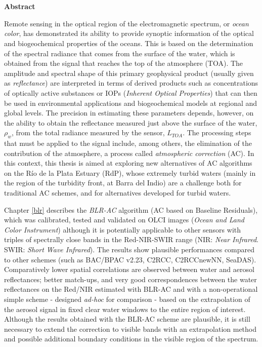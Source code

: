 \chapter*{\runtitle}

\noindent 
\textbf{Abstract}

Remote sensing in the optical region of the electromagnetic spectrum, or \textit{ocean color}, has demonstrated its ability to provide synoptic information of the optical and biogeochemical properties of the oceans. This is based on the determination of the spectral radiance that comes from the surface of the water, which is obtained from the signal that reaches the top of the atmosphere (TOA). The amplitude and spectral shape of this primary geophysical product (usually given as \textit {reflectance}) are interpreted in terms of derived products such as concentrations of optically active substances or IOPs (\textit{Inherent Optical Properties}) that can then be used in environmental applications and biogeochemical models at regional and global levels. The precision in estimating these parameters depends, however, on the ability to obtain the reflectance measured just above the surface of the water, $\rho_{w}$, from the total radiance measured by the sensor, $L_{TOA}$. The processing steps that must be applied to the signal include, among others, the elimination of the contribution of the atmosphere, a process called \textit{atmospheric correction} (AC). In this context, this thesis is aimed at exploring new alternatives of AC algorithms on the Río de la Plata Estuary (RdP), whose extremely turbid waters (mainly in the region of the turbidity front, at Barra del Indio) are a challenge both for traditional AC schemes, and for alternatives developed for turbid waters.

Chapter \ref{blr} describes the \textit{BLR-AC} algorithm (AC based on Baseline Residuals), which was calibrated, tested and validated on OLCI images (\textit{Ocean and Land Color Instrument}) although it is potentially applicable to other sensors with triples of spectrally close bands in the Red-NIR-SWIR range (NIR: \textit{Near Infrared}. SWIR: \textit{Short Wave Infrared}). The results show plausible performances compared to other schemes (such as BAC/BPAC v2.23, C2RCC, C2RCCnewNN, SeaDAS). Comparatively lower spatial correlations are observed between water and aerosol reflectances; better match-ups, and very good correspondences between the water reflectances on the Red/NIR estimated with BLR-AC and with a non-operational simple scheme - designed \textit{ad-hoc} for comparison - based on the extrapolation of the aerosol signal in fixed clear water windows to the entire region of interest. Although the results obtained with the BLR-AC scheme are plausible, it is still necessary to extend the correction to visible bands with an extrapolation method and possible additional boundary conditions in the visible region of the spectrum.

